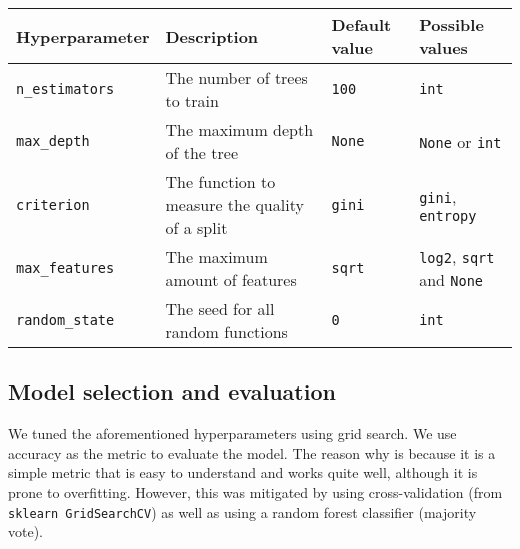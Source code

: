 \documentclass[11pt]{article}
\begin{document}
\begin{longtable}[]{@{}
  >{\raggedright\arraybackslash}p{}
  >{\raggedright\arraybackslash}p{}
  >{\raggedright\arraybackslash}p{}
  >{\raggedright\arraybackslash}p{}@{}}
\toprule\noalign{}
\begin{minipage}[b]{\linewidth}\raggedright
Hyperparameter
\end{minipage} & \begin{minipage}[b]{\linewidth}\raggedright
Description
\end{minipage} & \begin{minipage}[b]{\linewidth}\raggedright
Default value
\end{minipage} & \begin{minipage}[b]{\linewidth}\raggedright
Possible values
\end{minipage} \\
\midrule\noalign{}
\endhead
\bottomrule\noalign{}
\endlastfoot
\texttt{n\_estimators} & The number of trees to train & \texttt{100} &
\texttt{int} \\
\texttt{max\_depth} & The maximum depth of the tree & \texttt{None} &
\texttt{None} or \texttt{int} \\
\texttt{criterion} & The function to measure the quality of a split &
\texttt{gini} & \texttt{gini}, \texttt{entropy} \\
\texttt{max\_features} & The maximum amount of features & \texttt{sqrt}
& \texttt{log2}, \texttt{sqrt} and \texttt{None} \\
\texttt{random\_state} & The seed for all random functions & \texttt{0}
& \texttt{int} \\
\end{longtable}

    \subsection{Model selection and
evaluation}\label{model-selection-and-evaluation}

We tuned the aforementioned hyperparameters using grid search. We use
accuracy as the metric to evaluate the model. The reason why is because
it is a simple metric that is easy to understand and works quite well,
although it is prone to overfitting. However, this was mitigated by
using cross-validation (from \texttt{sklearn\ GridSearchCV}) as well as
using a random forest classifier (majority vote).
\end{document}
